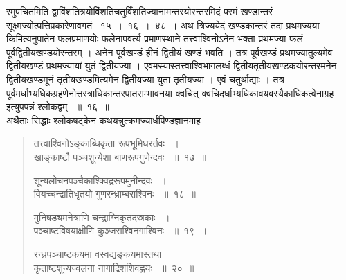 \documentclass[11pt, openany]{book}
\begin{document}
\begin{sloppypar}

\noindent रमुपचितमिति द्वाविंशतित्रयोविंशतिचतुर्विंशतिज्यानामन्तरयोरन्तरमिदं परमं खण्डान्तरं सूक्ष्मज्योत्पत्तिप्रकारेणावगतं ~१५~।~१६~।~४८~। अथ त्रिज्ययेदं खण्डकान्तरं तदा प्रथमज्यया किमित्यनुपातेन फलप्रमाणयोः फलेनापवर्त्य प्रमाणस्थाने तत्त्वाश्विनोऽनेन भक्ता प्रथमज्या फलं पूर्वद्वितीयखण्डयोरन्तरम् । अनेन पूर्वखण्डं हीनं द्वितीयं खण्डं भवति । तत्र पूर्वखण्डं प्रथमज्यातुल्यमेव । द्वितीयखण्डं प्रथमज्यायां युतं द्वितीयज्या । एवमस्यास्तत्त्वाश्विभागलब्धं द्वितीयतृतीयखण्डकयोरन्तरमनेन द्वितीयखण्डमूनं तृतीयखण्डमित्यमेन द्वितीयज्या युता तृतीयज्या । एवं चतुर्थाद्याः । तत्र पूर्वमर्धाभ्यधिकग्रहणेनोत्तरत्राधिकान्तरपातसम्भावनया क्वचित् क्वचिदर्धाभ्यधिकावयवस्यैकाधिकत्वेनाग्रह इत्युपपन्नं श्लोकद्वम् ~॥~१६~॥\\
\noindent अथैताः सिद्धाः श्लोकषट्केन कथयन्नुत्क्रमज्यार्धपिण्डज्ञानमाह\textendash
\end{sloppypar}
\begin{quote}

{\ssi तत्त्वाश्विनोऽङ्काब्धिकृता रूपभूमिधरर्तवः ~।\\
खाङ्काष्टौ पञ्चशून्येशा बाणरूपगुणेन्दवः ~॥~१७~॥

शून्यलोचनपञ्चैकाश्क्विद्ररूपमुनीन्दवः ~।\\
वियच्चन्द्रातिधृतयो गुणरन्ध्राम्बराश्विनः ~॥~१८~॥

मुनिषड्यमनेत्राणि चन्द्राग्निकृतदस्रकाः ~।\\
पञ्चाष्टविषयाक्षीणि कुञ्जराश्विनगाश्विनः ~॥~१९~॥

रन्ध्रपञ्चाष्टकयमा वस्वद्यङ्कयमास्तथा ~।\\
कृताष्टशून्यज्वलना नागाद्रिशशिवह्नयः ~॥~२०~॥}
\end{quote}
\newpage
\end{document}
